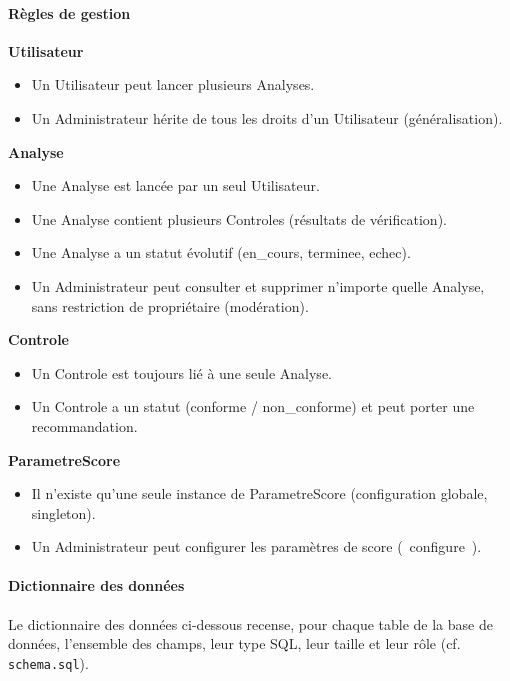 \paragraph{R\`egles de gestion}
\textbf{Utilisateur}
\begin{itemize}[nosep]
  \item Un Utilisateur peut lancer plusieurs Analyses.
  \item Un Administrateur h\'erite de tous les droits d'un Utilisateur (g\'en\'eralisation).
\end{itemize}
\textbf{Analyse}
\begin{itemize}[nosep]
  \item Une Analyse est lanc\'ee par un seul Utilisateur.
  \item Une Analyse contient plusieurs Controles (r\'esultats de v\'erification).
  \item Une Analyse a un statut \'evolutif (en\_cours, terminee, echec).
  \item Un Administrateur peut consulter et supprimer n'importe quelle Analyse, sans restriction de propri\'etaire (mod\'eration).
\end{itemize}
\textbf{Controle}
\begin{itemize}[nosep]
  \item Un Controle est toujours li\'e \`a une seule Analyse.
  \item Un Controle a un statut (conforme / non\_conforme) et peut porter une recommandation.
\end{itemize}
\textbf{ParametreScore}
\begin{itemize}[nosep]
  \item Il n'existe qu'une seule instance de ParametreScore (configuration globale, singleton).
  \item Un Administrateur peut configurer les param\`etres de score (\og~configure~\fg).
\end{itemize}

\paragraph{Dictionnaire des donn\'ees}

Le dictionnaire des donn\'ees ci-dessous recense, pour chaque table de la base de
donn\'ees, l'ensemble des champs, leur type SQL, leur taille et leur r\^ole (cf.
\texttt{schema.sql}).

